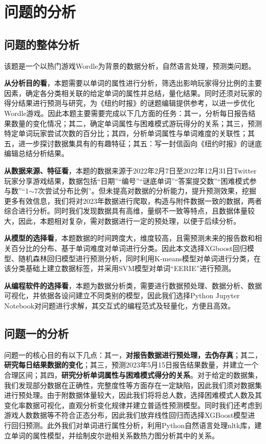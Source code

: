 \documentclass{MathModeling}
\begin{document}
	\section{问题的分析}
	\subsection{问题的整体分析}
	该题是一个以热门游戏Wordle为背景的数据分析，自然语言处理，预测类问题。

	\textbf{从分析目的看}，本题需要以单词的属性进行分析，筛选出影响玩家得分比例的主要因素，确定各分类相关联的给定单词的属性并总结，量化结果。同时还须对玩家的得分结果进行预测与研究，为《纽约时报》的谜题编辑提供参考，以进一步优化Wordle游戏。因此本题主要需要完成以下几方面的任务：{\heiti 其一}，分析每日报告结果数量的变化情况；{\heiti 其二}，确定单词属性与困难模式游玩得分的关系；{\heiti 其三}，预测特定单词玩家尝试次数的百分比；{\heiti 其四}，分析单词属性与单词难度的关联性；{\heiti 其五}，进一步探讨数据集具有的有趣特征；{\heiti 其五}：写一封信函向《纽约时报》的谜底编辑总结分析结果。

	\textbf{从数据来源、特征看}，本题的数据来源于2022年2月7日至2022年12月31日Twitter玩家分享游戏结果，数据包括“日期”“编号”“谜底单词”“答案提交数”“困难模式参与数”“1$\sim$7次尝试分布比例”。但未提高对数据的分析能力，提升预测效果，挖掘更多有效信息，我们将对2023年数据进行爬取，构造与附件数据一致的数据，两者综合进行分析。同时我们发现数据具有高维，量纲不一致等特点，且数据体量较大，因此，本题相对复杂，需对数据进行一定的预处理，以便于后续分析。

	\textbf{从模型的选择看}，本题数据的时间跨度大，维度较高，且需预测未来的报告数和相关百分比的分布、基于单词难度对单词进行分类。因此本文选择XGboost回归模型、随机森林回归模型进行预测分析，同时利用K-means模型对单词进行分类，在该分类基础上建立数据标签，并采用SVM模型对单词“EERIE”进行预测。

	\textbf{从编程软件的选择看}，本题为数据分析类，需要进行数据预处理、数据分析、数据可视化，并依据各设问建立不同类别的模型，因此我们选择Python Jupyter Notebook对问题进行求解，其交互式的编程范式及轻量化，方便且高效。
	
	\subsection{问题一的分析}
	问题一的核心目的有以下几点：{\heiti 其一}，\textbf{对报告数据进行预处理，去伪存真}；{\heiti 其二}，\textbf{研究每日结果数据的变化}；{\heiti 其三}，预测2023年5月15日报告结果数量，并建立一个合理区间；{\heiti 其四}，\textbf{研究分析单词属性与困难模式得分的关系}。对于给定的数据集，我们发现部分数据在正确性，完整度性等方面存在一定缺陷，因此我们须对数据集进行预处理。由于附数据体量较大，因此我们将将总人数，选择困难模式人数及其变化率数据可视化，直观分析变化规律并建立普适性预测模型。同时我们还考虑到游戏人数数据等不符合正态分布，因此我们放弃线性回归而选择XGBoost模型进行回归预测。此外我们对单词进行属性分析，利用Python自然语言处理nltk库，建立单词的属性模型，并绘制皮尔逊相关系数热力图分析其中的关系。
\end{document}
